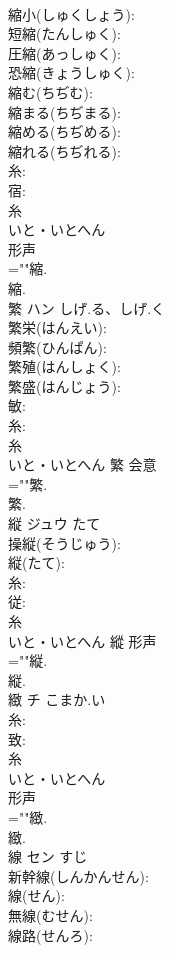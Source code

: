 \documentclass[8pt]{extreport}
\begin{document}
\begin{CJK}{UTF8}{min}
\\	縮小(しゅくしょう): 
\\	短縮(たんしゅく): 
\\	圧縮(あっしゅく): 
\\	恐縮(きょうしゅく): 
\\	縮む(ちぢむ): 
\\	縮まる(ちぢまる): 
\\	縮める(ちぢめる): 
\\	縮れる(ちぢれる): 
\\	糸: 
\\	宿: 
\\	糸	
\\	いと・いとへん	
\\	形声 
\\	=""縮.
\\	縮.
\\	繁	ハン	しげ.る、しげ.く		
\\	繁栄(はんえい): 
\\	頻繁(ひんぱん): 
\\	繁殖(はんしょく): 
\\	繁盛(はんじょう): 
\\	敏: 
\\	糸: 
\\	糸	
\\	いと・いとへん	繁	会意 
\\	=""繁.
\\	繁.
\\	縦	ジュウ	たて		
\\	操縦(そうじゅう): 
\\	縦(たて): 
\\	糸: 
\\	従: 
\\	糸	
\\	いと・いとへん	縱	形声 
\\	=""縦.
\\	縦.
\\	緻	チ	こまか.い		
\\	糸: 
\\	致: 
\\	糸	
\\	いと・いとへん	
\\	形声 
\\	=""緻.
\\	緻.
\\	線	セン	すじ		
\\	新幹線(しんかんせん): 
\\	線(せん): 
\\	無線(むせん): 
\\	線路(せんろ): 

\end{CJK}
\end{document}

